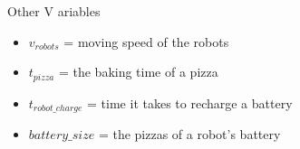 \begin{frame}{Other V   ariables}
    \begin{itemize}
        \item $v_{robots}$ = moving speed of the robots
        \item $t_{pizza}$ = the baking time of a pizza
        \item $t_{robot\_charge}$ = time it takes to recharge a battery
        \item $battery\_size$ = the pizzas of a robot's battery
    \end{itemize}
\end{frame}
